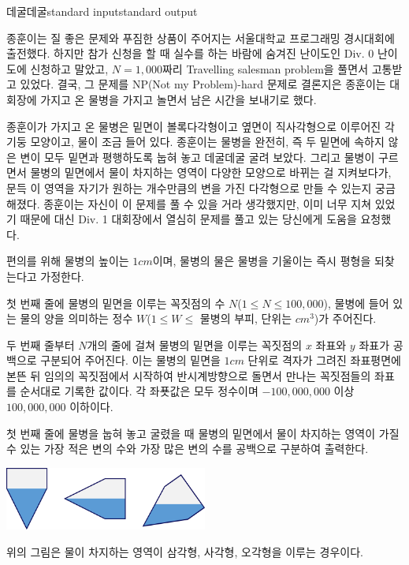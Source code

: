 \begin{problem}{데굴데굴}{standard input}{standard output}

종훈이는 질 좋은 문제와 푸짐한 상품이 주어지는 서울대학교 프로그래밍 경시대회에 출전했다. 하지만 참가 신청을 할 때 실수를 하는 바람에 숨겨진 난이도인 Div. 0 난이도에 신청하고 말았고, $N = 1,000$짜리 Travelling salesman problem을 풀면서 고통받고 있었다. 결국, 그 문제를 NP(Not my Problem)-hard 문제로 결론지은 종훈이는 대회장에 가지고 온 물병을 가지고 놀면서 남은 시간을 보내기로 했다.

종훈이가 가지고 온 물병은 밑면이 볼록다각형이고 옆면이 직사각형으로 이루어진 각기둥 모양이고, 물이 조금 들어 있다. 종훈이는 물병을 완전히, 즉 두 밑면에 속하지 않은 변이 모두 밑면과 평행하도록 눕혀 놓고 데굴데굴 굴려 보았다. 그리고 물병이 구르면서 물병의 밑면에서 물이 차지하는 영역이 다양한 모양으로 바뀌는 걸 지켜보다가, 문득 이 영역을 자기가 원하는 개수만큼의 변을 가진 다각형으로 만들 수 있는지 궁금해졌다. 종훈이는 자신이 이 문제를 풀 수 있을 거라 생각했지만, 이미 너무 지쳐 있었기 때문에 대신 Div. 1 대회장에서 열심히 문제를 풀고 있는 당신에게 도움을 요청했다.

편의를 위해 물병의 높이는 $1cm$이며, 물병의 물은 물병을 기울이는 즉시 평형을 되찾는다고 가정한다.

\InputFile
첫 번째 줄에 물병의 밑면을 이루는 꼭짓점의 수 $N$($1 \le N \le 100,000$), 물병에 들어 있는 물의 양을 의미하는 정수 $W$($1 \le W \le$ 물병의 부피, 단위는 $cm^{3}$)가 주어진다.

두 번째 줄부터 $N$개의 줄에 걸쳐 물병의 밑면을 이루는 꼭짓점의 $x$ 좌표와 $y$ 좌표가 공백으로 구분되어 주어진다. 이는 물병의 밑면을 $1cm$ 단위로 격자가 그려진 좌표평면에 본뜬 뒤 임의의 꼭짓점에서 시작하여 반시계방향으로 돌면서 만나는 꼭짓점들의 좌표를 순서대로 기록한 값이다. 각 좌푯값은 모두 정수이며 $-100,000,000$ 이상 $100,000,000$ 이하이다.

\OutputFile
첫 번째 줄에 물병을 눕혀 놓고 굴렸을 때 물병의 밑면에서 물이 차지하는 영역이 가질 수 있는 가장 적은 변의 수와 가장 많은 변의 수를 공백으로 구분하여 출력한다.

\Example

\begin{example}
%
\end{example}

\Notes
\begin{center}
  \includegraphics[width=0.5\textwidth]{roll.png}
\end{center}

위의 그림은 물이 차지하는 영역이 삼각형, 사각형, 오각형을 이루는 경우이다.

\end{problem}
